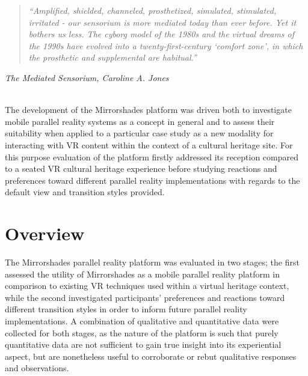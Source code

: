 \begin{quote}
	\textit{``Amplified, shielded, channeled, prosthetized, simulated, stimulated, irritated - our sensorium is more mediated today than ever before. Yet it bothers us less. The cyborg model of the 1980s and the virtual dreams of the 1990s have evolved into a twenty-first-century `comfort zone', in which the prosthetic and supplemental are habitual.''}
\end{quote}
\hfill \textit{The Mediated Sensorium, Caroline A. Jones}
\\
\\


\label{chapter-eval-1}

The development of the Mirrorshades platform was driven both to investigate mobile parallel reality systems as a concept in general and to assess their suitability when applied to a particular case study as a new modality for interacting with VR content within the context of a cultural heritage site. For this purpose evaluation of the platform firstly addressed its reception compared to a seated VR cultural heritage experience before studying reactions and preferences toward different parallel reality implementations with regards to the default view and transition styles provided.




\section{Overview}

The Mirrorshades parallel reality platform was evaluated in two stages; the first assessed the utility of Mirrorshades as a mobile parallel reality platform in comparison to existing VR techniques used within a virtual heritage context, while the second investigated participants' preferences and reactions toward different transition styles in order to inform future parallel reality implementations. A combination of qualitative and quantitative data were collected for both stages, as the nature of the platform is such that purely quantitative data are not sufficient to gain true insight into its experiential aspect, but are nonetheless useful to corroborate or rebut qualitative responses and observations.

